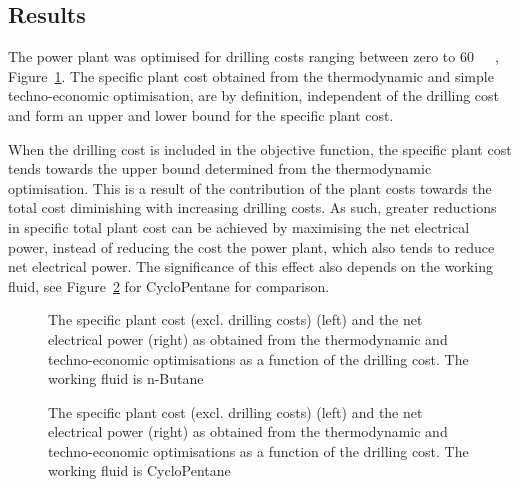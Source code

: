 \subsection{Results}
    The power plant was optimised for drilling costs ranging between zero to \qty{60}{\mega\USD{}}, Figure~\ref{fig:prosim_purewater_drilling}. The specific plant cost obtained from the thermodynamic and simple techno-economic optimisation, are by definition, independent of the drilling cost and form an upper and lower bound for the specific plant cost.

    When the drilling cost is included in the objective function, the specific plant cost tends towards the upper bound determined from the thermodynamic optimisation. This is a result of the contribution of the plant costs towards the total cost diminishing with increasing drilling costs. As such, greater reductions in specific total plant cost can be achieved by maximising the net electrical power, instead of reducing the cost the power plant, which also tends to reduce net electrical power. The significance of this effect also depends on the working fluid, see Figure~\ref{fig:prosim_purewater_drilling_cyclopentane} for CycloPentane for comparison. 
    
    \begin{figure}[H]
        \centering
        \resizebox{\linewidth}{!}{}
        \caption[The specific plant cost (excl. drilling costs) and net electrical power (right) obtained from thermodynamic and techno-economic optimisations using n-Butane as the working fluid.]{The specific plant cost (excl. drilling costs) (left) and the net electrical power (right) as obtained from the thermodynamic and techno-economic optimisations as a function of the drilling cost. The working fluid is n-Butane}
        \label{fig:prosim_purewater_drilling}
    \end{figure}

    \begin{figure}[H]
        \centering
        \resizebox{\linewidth}{!}{}
        \caption[The specific plant cost (excl. drilling costs) and net electrical power (right) obtained from thermodynamic and techno-economic optimisations using CycloPentane as the working fluid.]{The specific plant cost (excl. drilling costs) (left) and the net electrical power (right) as obtained from the thermodynamic and techno-economic optimisations as a function of the drilling cost. The working fluid is CycloPentane}
        \label{fig:prosim_purewater_drilling_cyclopentane}
    \end{figure}

\clearpage